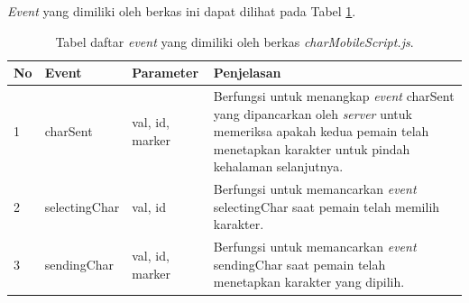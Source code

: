 \begin{enumerate}
\begin{enumerate}
\begin{enumerate}
			\textit{Event} yang dimiliki oleh berkas ini dapat dilihat pada Tabel \ref{table:event_charMobileScript}.
			\begin{table}[H]
				\centering
				\caption{Tabel daftar \textit{event} yang dimiliki oleh berkas \textit{charMobileScript.js}.}
				\begin{tabular}{|p{0.35cm}|p{3cm}|p{3cm}|p{7cm}|}
					\hline
					No & Event & Parameter & Penjelasan \\ \hline
					1 & charSent & val, id, marker & Berfungsi untuk menangkap \textit{event} charSent yang dipancarkan oleh \textit{server} untuk memeriksa apakah kedua pemain telah menetapkan karakter untuk pindah kehalaman selanjutnya. \\ \hline
					2 & selectingChar & val, id & Berfungsi untuk memancarkan \textit{event} selectingChar saat pemain telah memilih karakter. \\ \hline
					3 & sendingChar & val, id, marker & Berfungsi untuk memancarkan \textit{event} sendingChar saat pemain telah menetapkan karakter yang dipilih. \\ \hline
				\end{tabular}
				\label{table:event_charMobileScript}
			\end{table}
%				
%			
			

\end{enumerate}
\end{enumerate}
\end{enumerate}

